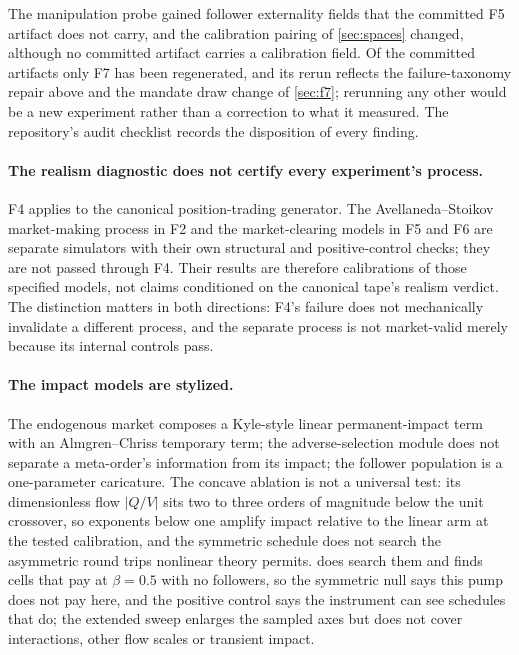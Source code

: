 The manipulation probe gained follower externality fields that the committed F5 artifact does not carry, and the calibration pairing of \cref{sec:spaces} changed, although no committed artifact carries a calibration field. Of the committed artifacts only F7 has been regenerated, and its rerun reflects the failure-taxonomy repair above and the mandate draw change of \cref{sec:f7}; rerunning any other would be a new experiment rather than a correction to what it measured. The repository's audit checklist records the disposition of every finding.

\paragraph{The realism diagnostic does not certify every experiment's process.} F4 applies to the canonical position-trading generator. The Avellaneda--Stoikov market-making process in F2 and the market-clearing models in F5 and F6 are separate simulators with their own structural and positive-control checks; they are not passed through F4. Their results are therefore calibrations of those specified models, not claims conditioned on the canonical tape's realism verdict. The distinction matters in both directions: F4's failure does not mechanically invalidate a different process, and the separate process is not market-valid merely because its internal controls pass.

\paragraph{The impact models are stylized.} The endogenous market composes a Kyle-style linear permanent-impact term with an Almgren--Chriss temporary term; the adverse-selection module does not separate a meta-order's information from its impact; the follower population is a one-parameter caricature. The concave ablation is not a universal test: its dimensionless flow $|Q/V|$ sits two to three orders of magnitude below the unit crossover, so exponents below one amplify impact relative to the linear arm at the tested calibration, and the symmetric schedule does not search the asymmetric round trips nonlinear theory permits.  does search them and finds cells that pay at $\beta = 0.5$ with no followers, so the symmetric null says this pump does not pay here, and the positive control says the instrument can see schedules that do; the extended sweep enlarges the sampled axes but does not cover interactions, other flow scales or transient impact.

